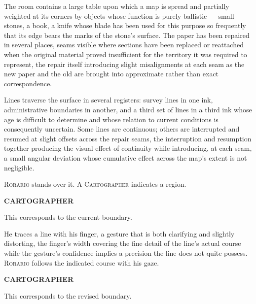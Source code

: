 \documentclass[12pt, oneside]{article}
\newenvironment{action}{%
  \vspace{0.6em}%
  \noindent\ignorespaces%
}{%
  \par\vspace{0.6em}%
}
\newcommand{\character}[1]{%
  \vspace{0.8em}%
  \begin{center}%
    \bfseries\MakeUppercase{#1}%
  \end{center}%
  \vspace{-0.3em}%
}
\newenvironment{dialogue}{%
  \vspace{0.2em}%
  \begin{list}{}{%
    \setlength{\leftmargin}{1.2in}%
    \setlength{\rightmargin}{0.8in}%
    \setlength{\itemsep}{0.6em}%
    \setlength{\parsep}{0pt}%
  }%
}{%
  \end{list}%
  \vspace{0.4em}%
}
\newcommand{\says}[2]{%
  \character{#1}%
  \begin{dialogue}\item #2\end{dialogue}%
}
\begin{document}
\begin{action}
The room contains a large table upon which a map is spread and partially weighted at its corners by objects whose function is purely ballistic --- small stones, a book, a knife whose blade has been used for this purpose so frequently that its edge bears the marks of the stone's surface. The paper has been repaired in several places, seams visible where sections have been replaced or reattached when the original material proved insufficient for the territory it was required to represent, the repair itself introducing slight misalignments at each seam as the new paper and the old are brought into approximate rather than exact correspondence.

Lines traverse the surface in several registers: survey lines in one ink, administrative boundaries in another, and a third set of lines in a third ink whose age is difficult to determine and whose relation to current conditions is consequently uncertain. Some lines are continuous; others are interrupted and resumed at slight offsets across the repair seams, the interruption and resumption together producing the visual effect of continuity while introducing, at each seam, a small angular deviation whose cumulative effect across the map's extent is not negligible.

\textsc{Rorario} stands over it. A \textsc{Cartographer} indicates a region.
\end{action}

\says{Cartographer}{This corresponds to the current boundary.}

\begin{action}
He traces a line with his finger, a gesture that is both clarifying and slightly distorting, the finger's width covering the fine detail of the line's actual course while the gesture's confidence implies a precision the line does not quite possess. \textsc{Rorario} follows the indicated course with his gaze.
\end{action}

\says{Cartographer}{This corresponds to the revised boundary.}
\end{document}
